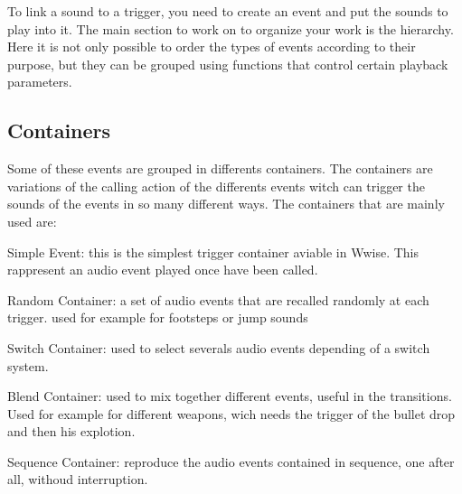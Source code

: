 To link a sound to a trigger, you need to create an event and put the sounds to play into it. The main section to work on to organize your work is the hierarchy. Here it is not only possible to order the types of events according to their purpose, but they can be grouped using functions that control certain playback parameters. 

	\subsection{Containers}
	Some of these events are grouped in differents containers. The containers are variations of the calling action of the differents events witch can trigger the sounds of the events in so many different ways. The containers that are mainly used are:
	
	\begin{compactitem}
		\item Simple Event: this is the simplest trigger container aviable in Wwise. This rappresent an audio event played once have been called.
		\item Random Container:  a set of audio events that are recalled randomly at each trigger. used for example for footsteps or jump sounds
		\item Switch Container: used to select severals audio events depending of a switch system.
		\item Blend Container: used to mix together different events, useful in the transitions. Used for example for different weapons, wich needs the trigger of the bullet drop and then his explotion.
		\item Sequence Container: reproduce the audio events contained in sequence, one after all, withoud interruption.
	\end{compactitem}

